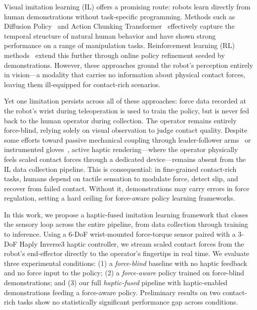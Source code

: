 \documentclass[letterpaper, 10 pt, conference]{ieeeconf}  %
\begin{document}
Visual imitation learning (IL) offers a promising route: robots learn directly 
from human demonstrations without task-specific programming. Methods such as 
Diffusion Policy~\cite{chi2024diffusionpolicy} and Action Chunking 
Transformer~\cite{zhao2023act} effectively capture the temporal structure of 
natural human behavior and have shown strong performance on a range of 
manipulation tasks. Reinforcement learning (RL) 
methods~\cite{luo2024serl,luo2024hilserl,rajeswaran2018dexterous} extend this 
further through online policy refinement seeded by demonstrations. However, 
these approaches ground the robot's perception entirely in vision---a modality 
that carries no information about physical contact forces, leaving them 
ill-equipped for contact-rich scenarios.

Yet one limitation persists across all of these approaches: force data recorded
at the robot's wrist during teleoperation is used to train the policy, but is
never fed back to the human operator during collection. The operator remains
entirely force-blind, relying solely on visual observation to judge contact
quality. Despite some efforts toward passive mechanical coupling through
leader-follower arms~\cite{zhao2023act} or instrumented gloves~\cite{liu2025forcemimic},
active haptic rendering---where the operator physically feels scaled contact forces
through a dedicated device---remains absent from the IL data collection pipeline.
This is consequential: in fine-grained contact-rich tasks, humans depend on
tactile sensation to modulate force, detect slip, and recover from failed contact.
Without it, demonstrations may carry errors in force regulation, setting a hard ceiling 
for force-aware policy learning frameworks.

In this work, we propose a haptic-fused imitation learning framework that closes
the sensory loop across the entire pipeline, from data collection through training
to inference. Using a 6-DoF wrist-mounted force-torque sensor paired with a 3-DoF
Haply Inverse3 haptic controller, we stream scaled contact forces from the robot's
end-effector directly to the operator's fingertips in real time. We evaluate three
experimental conditions: (1) a \textit{force-blind} baseline with no haptic
feedback and no force input to the policy; (2) a \textit{force-aware} policy
trained on force-blind demonstrations; and (3) our full \textit{haptic-fused}
pipeline with haptic-enabled demonstrations feeding a force-aware policy.
Preliminary results on two contact-rich tasks show no statistically significant
performance gap across conditions. 
\end{document}
